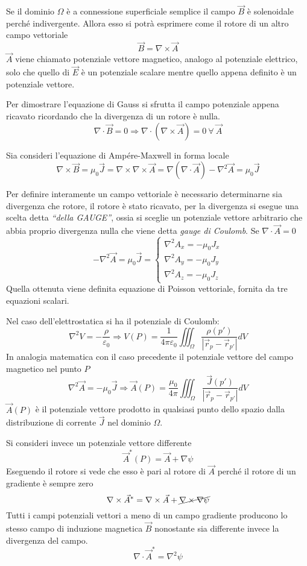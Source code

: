Se il dominio $\Omega$ è a connessione superficiale semplice il campo $\vec{B}$ è solenoidale
perché indivergente. Allora esso si potrà esprimere come il rotore di un altro campo vettoriale
$$
\vec{B} = \nabla\times\vec{A}
$$
$\vec{A}$ viene chiamato potenziale vettore magnetico, analogo al potenziale elettrico, solo che quello
di $\vec{E}$ è un potenziale scalare mentre quello appena definito è un potenziale vettore.

Per dimostrare l'equazione di Gauss si sfrutta il campo potenziale appena ricavato ricordando che la divergenza 
di un rotore è nulla.
$$
\nabla\cdot\vec{B} = 0 \Rightarrow \nabla\cdot(\nabla\times\vec{A}) = 0\ \forall\ \vec{A}
$$

Sia consideri l'equazione di Ampére-Maxwell in forma locale
$$
\nabla\times\vec{B} = \mu_0 \vec{J} = \nabla\times\nabla\times\vec{A} =  
\nabla(\nabla\cdot\vec{A}) - \nabla^2\vec{A} = \mu_0\vec{J}
$$

Per definire interamente un campo vettoriale è necessario determinarne sia divergenza che rotore, il 
rotore è stato ricavato, per la divergenza si esegue una scelta detta \textit{``della GAUGE''}, ossia
si sceglie un potenziale vettore arbitrario che abbia proprio divergenza nulla che viene detta
\textit{gauge di Coulomb}.
Se $\nabla\cdot\vec{A}=0$
$$
-\nabla^2\vec{A} = \mu_0\vec{J} = \begin{cases}
\nabla^2 A_x = -\mu_0 J_x \\
\nabla^2 A_y = -\mu_0 J_y \\
\nabla^2 A_z = -\mu_0 J_z 
\end{cases}
$$
Quella ottenuta viene definita equazione di Poisson vettoriale, fornita da tre equazioni
scalari.

Nel caso dell'elettrostatica si ha il potenziale di Coulomb:
$$
\nabla^2V = -\frac{\rho}{\varepsilon_0} \Rightarrow V(P) = \frac{1}{4\pi\varepsilon_0}\iiint_\Omega\frac{\rho(p')}{|\vec{r}_{p}-\vec{r}_{p'}|}dV
$$
In analogia matematica con il caso precedente il potenziale vettore del campo magnetico nel 
punto $P$
$$
\nabla^2\vec{A} = -\mu_0\vec{J} \Rightarrow \vec{A}(P) = \frac{\mu_0}{4\pi} \iiint_\Omega \frac{\vec{J}(p')}{|\vec{r}_p-\vec{r}_{p'}|}dV
$$
$\vec{A}(P)$ è il potenziale vettore prodotto in qualsiasi punto dello spazio dalla 
distribuzione di corrente $\vec{J}$ nel dominio $\Omega$.

Si consideri invece un potenziale vettore differente
$$
\vec{A}^*(P) = \vec{A} + \nabla\psi 
$$
Eseguendo il rotore si vede che esso è pari al rotore di $\vec{A}$ perché il rotore di un 
gradiente è sempre zero
$$
\nabla\times\vec{A}^* = \nabla\times\vec{A} + \cancel{\nabla\times\nabla\psi}
$$
Tutti i campi potenziali vettori a meno di un campo gradiente producono lo stesso
campo di induzione magnetica $\vec{B}$ nonostante sia differente invece la divergenza
del campo.
$$
\nabla\cdot\vec{A}^* = \nabla^2\psi
$$

